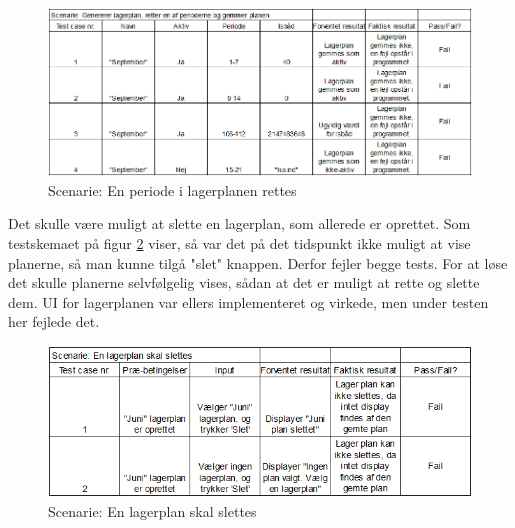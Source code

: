 \begin{figure}[p]
    \centering
    \includegraphics[width=0.7\hsize]{figures/tests/test_ret_plan.png}
    \caption{Scenarie: En periode i lagerplanen rettes}
    \label{fig:testeditperiod}
\end{figure}

Det skulle være muligt at slette en lagerplan, som allerede er oprettet. Som testskemaet på figur \ref{fig:testdelete} viser, så var det på det tidspunkt ikke muligt at vise planerne, så man kunne tilgå "slet" knappen. Derfor fejler begge tests. For at løse det skulle planerne selvfølgelig vises, sådan at det er muligt at rette og slette dem. UI for lagerplanen var ellers implementeret og virkede, men under testen her fejlede det.

\begin{figure}[h]
    \centering
    \includegraphics[width=0.7\hsize]{figures/tests/test_slet_lagerplan.png}
    \caption{Scenarie: En lagerplan skal slettes}
    \label{fig:testdelete}
\end{figure}






